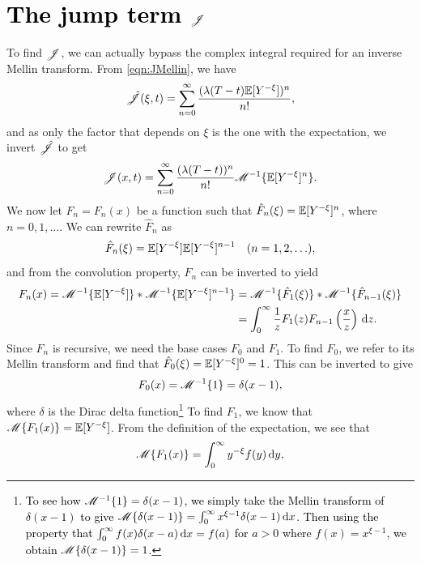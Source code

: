 \section{\textcolor{black}{The jump term $\mathscr J$}}
To find $\mathscr J$, we can actually bypass the complex integral required for an inverse Mellin transform. From \eqref{eqn:JMellin}, we have
	\begin{align*}
		\hat {\mathscr J}(\xi,t) = \displaystyle\sum\limits_{n=0}^{\infty} \frac{(\lambda(T-t)\mathbb E[Y^{-\xi}])^n}{n!},
	\end{align*}
and as only the factor that depends on $\xi$ is the one with the expectation, we invert $\hat {\mathscr J}$ to get
	\begin{equation}
		\label{eqn:Jhat}
		\mathscr J(x,t) = \displaystyle\sum\limits_{n=0}^{\infty} \frac{(\lambda(T-t))^n}{n!}\mathscr M^{-1}\{ \mathbb E[Y^{-\xi}]^n \}.
	\end{equation}
We now let $F_n = F_n(x)$ be a function such that $\hat F_n(\xi) = \mathbb E[Y^{-\xi}]^n$, where $ n = 0, 1, \ldots$. We can rewrite $\hat F_n$ as
	\begin{equation*}
		\hat F_n(\xi) = \mathbb E[Y^{-\xi}] \mathbb E[Y^{-\xi}]^{n-1} \quad (n = 1,2,\ldots),
	\end{equation*}
and from the convolution property, $\hat F_n$ can be inverted to yield
	\begin{align*}
		F_n(x) = \mathscr M^{-1} \{ \mathbb E[Y^{-\xi}] \} \ast \mathscr M^{-1} \{ \mathbb E[Y^{-\xi}]^{n-1} \} &= \mathscr M^{-1}\{ \hat F_1(\xi) \} \ast \mathscr M^{-1}\{ \hat F_{n-1}(\xi) \} \\
		&= \int_0^\infty \frac{1}{z} F_1(z)F_{n-1}\left( \frac{x}{z} \right) \, \mathrm d z.
	\end{align*}
Since $F_n$ is recursive, we need the base cases $F_0$ and $F_1$. To find $F_0$, we refer to its Mellin transform and find that $\hat F_0(\xi) = \mathbb E[Y^{-\xi}]^0 = 1$. This can be inverted to give
	\begin{equation*}
		F_0(x) = \mathscr M^{-1}\{ 1 \} = \delta(x-1),
	\end{equation*}
where $\delta$ is the Dirac delta function\footnote{\textcolor{black}{To see how $\mathscr M^{-1}\{1\} = \delta(x-1)$, we simply take the Mellin transform of $\delta(x-1)$ to give $\mathscr M\{\delta(x-1)\} = \int_0^\infty x^{\xi-1}\delta(x-1) \, \mathrm d x$. Then using the property that $\int_0^\infty f(x)\delta(x-a) \, \mathrm d x = f(a)$ for $a > 0$ where $f(x) = x^{\xi-1}$, we obtain $\mathscr M\{\delta(x-1)\} = 1$.}}
To find $F_1$, we know that $\mathscr M \{ F_1(x) \} = \mathbb E[Y^{-\xi}]$. From the definition of the expectation, we see that\begin{equation*}
		\mathscr M \{ F_1(x) \} = \int_0^\infty y^{-\xi} f(y) \, \mathrm d y,
	\end{equation*}
